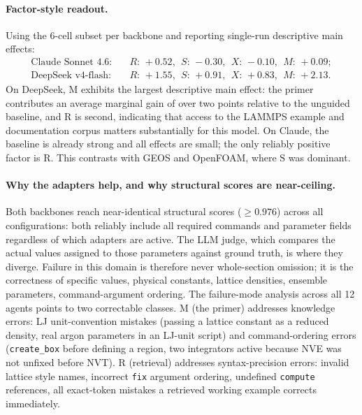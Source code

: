 \documentclass{article}
\begin{document}
\paragraph{Factor-style readout.}
Using the 6-cell subset per backbone and reporting single-run descriptive main effects:
\begin{align*}
\text{Claude Sonnet 4.6:}\quad & R{:}\,{+}0.52,\ \ S{:}\,{-}0.30,\ \ X{:}\,{-}0.10,\ \ M{:}\,{+}0.09;\\
\text{DeepSeek v4-flash:}\quad & R{:}\,{+}1.55,\ \ S{:}\,{+}0.91,\ \ X{:}\,{+}0.83,\ \ M{:}\,{+}2.13.
\end{align*}
On DeepSeek, $\mathrm{M}$ exhibits the largest descriptive main effect: the primer contributes an average marginal gain of over two points relative to the unguided baseline, and $\mathrm{R}$ is second, indicating that access to the LAMMPS example and documentation corpus matters substantially for this model. On Claude, the baseline is already strong and all effects are small; the only reliably positive factor is $\mathrm{R}$. This contrasts with GEOS and OpenFOAM, where $\mathrm{S}$ was dominant.

\paragraph{Why the adapters help, and why structural scores are near-ceiling.}
Both backbones reach near-identical structural scores ($\geq 0.976$) across all configurations: both reliably include all required commands and parameter fields regardless of which adapters are active. The LLM judge, which compares the actual values assigned to those parameters against ground truth, is where they diverge. Failure in this domain is therefore never whole-section omission; it is the correctness of specific values, physical constants, lattice densities, ensemble parameters, command-argument ordering. The failure-mode analysis across all 12 agents points to two correctable classes. $\mathrm{M}$ (the primer) addresses knowledge errors: LJ unit-convention mistakes (passing a lattice constant as a reduced density, real argon parameters in an LJ-unit script) and command-ordering errors (\texttt{create\_box} before defining a region, two integrators active because NVE was not unfixed before NVT). $\mathrm{R}$ (retrieval) addresses syntax-precision errors: invalid lattice style names, incorrect \texttt{fix} argument ordering, undefined \texttt{compute} references, all exact-token mistakes a retrieved working example corrects immediately.
\end{document}
